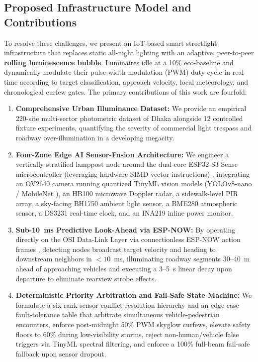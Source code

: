 \documentclass[11pt,a4paper]{article}
\begin{document}
\subsection{Proposed Infrastructure Model and Contributions}
To resolve these challenges, we present an IoT-based smart streetlight infrastructure that replaces static all-night lighting with an adaptive, peer-to-peer \textbf{rolling luminescence bubble}. Luminaires idle at a 10\% eco-baseline and dynamically modulate their pulse-width modulation (PWM) duty cycle in real time according to target classification, approach velocity, local meteorology, and chronological curfew gates. The primary contributions of this work are fourfold:
\begin{enumerate}
    \item \textbf{Comprehensive Urban Illuminance Dataset:} We provide an empirical 220-site multi-sector photometric dataset of Dhaka alongside 12 controlled fixture experiments, quantifying the severity of commercial light trespass and roadway over-illumination in a developing megacity.
    \item \textbf{Four-Zone Edge AI Sensor-Fusion Architecture:} We engineer a vertically stratified lamppost node around the dual-core ESP32-S3 Sense microcontroller (leveraging hardware SIMD vector instructions) \cite{espressif_esp32s3}, integrating an OV2640 camera running quantized TinyML vision models (YOLOv8-nano \cite{redmon_yolo} / MobileNet \cite{howard2017mobilenets}), an HB100 microwave Doppler radar, a sidewalk-level PIR array, a sky-facing BH1750 ambient light sensor, a BME280 atmospheric sensor, a DS3231 real-time clock, and an INA219 inline power monitor.
    \item \textbf{Sub-10~ms Predictive Look-Ahead via ESP-NOW:} By operating directly on the OSI Data-Link Layer via connectionless ESP-NOW action frames \cite{espressif_espnow}, detecting nodes broadcast target velocity and heading to downstream neighbors in \(<10\)~ms, illuminating roadway segments 30--40~m ahead of approaching vehicles and executing a 3--5~s linear decay upon departure to eliminate rearview strobe effects.
    \item \textbf{Deterministic Priority Arbitration and Fail-Safe State Machine:} We formulate a six-rank sensor conflict-resolution hierarchy and an edge-case fault-tolerance table that arbitrate simultaneous vehicle-pedestrian encounters, enforce post-midnight 50\% PWM skyglow curfews, elevate safety floors to 60\% during low-visibility storms, reject non-human/vehicle false triggers via TinyML spectral filtering, and enforce a 100\% full-beam fail-safe fallback upon sensor dropout.
\end{enumerate}
\end{document}
